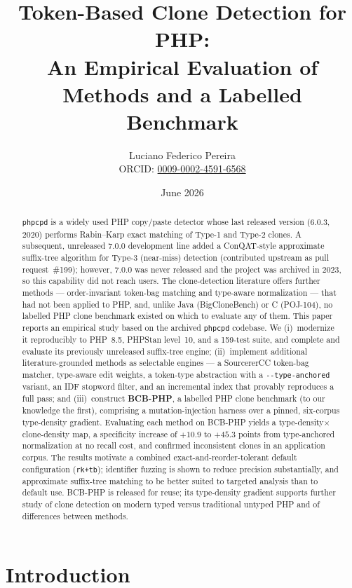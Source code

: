 \documentclass[10pt,a4paper]{article}
\title{\textbf{Token-Based Clone Detection for PHP:\\
An Empirical Evaluation of Methods and a Labelled Benchmark}}
\author{Luciano Federico Pereira\\[2pt]
\small ORCID: \href{https://orcid.org/0009-0002-4591-6568}{0009-0002-4591-6568}}
\date{June 2026}
\newcounter{lem}[section]
\begin{document}
\maketitle

\begin{abstract}
\noindent
\texttt{phpcpd} is a widely used PHP copy/paste detector whose last released version (6.0.3, 2020)
performs Rabin--Karp exact matching of Type-1 and Type-2 clones. A subsequent, unreleased 7.0.0
development line added a ConQAT-style approximate suffix-tree algorithm for Type-3 (near-miss)
detection (contributed upstream as pull request~\#199); however, 7.0.0 was never released and the
project was archived in 2023, so this capability did not reach users. The clone-detection literature
offers further methods --- order-invariant token-bag matching and type-aware normalization --- that
had not been applied to PHP, and, unlike Java (BigCloneBench) or C (POJ-104), no labelled PHP clone
benchmark existed on which to evaluate any of them. This paper reports an empirical study based on the
archived \texttt{phpcpd} codebase. We (i)~modernize it reproducibly to PHP~8.5, PHPStan level~10, and a
159-test suite, and complete and evaluate its previously unreleased suffix-tree engine; (ii)~implement
additional literature-grounded methods as selectable engines --- a SourcererCC token-bag matcher,
type-aware edit weights, a token-type abstraction with a \texttt{-{}-type-anchored} variant, an IDF
stopword filter, and an incremental index that provably reproduces a full pass; and (iii)~construct
\textbf{BCB-PHP}, a labelled PHP clone benchmark (to our knowledge the first), comprising a
mutation-injection harness over a pinned, six-corpus type-density gradient. Evaluating each method on
BCB-PHP yields a type-density$\times$clone-density map, a specificity increase of $+10.9$ to $+45.3$
points from type-anchored normalization at no recall cost, and confirmed inconsistent clones in an
application corpus. The results motivate a combined exact-and-reorder-tolerant default configuration
(\texttt{rk+tb}); identifier fuzzing is shown to reduce precision substantially, and approximate
suffix-tree matching to be better suited to targeted analysis than to default use. BCB-PHP is released
for reuse; its type-density gradient supports further study of clone detection on modern typed versus
traditional untyped PHP and of differences between methods.
\end{abstract}

\section{Introduction}
\end{document}
